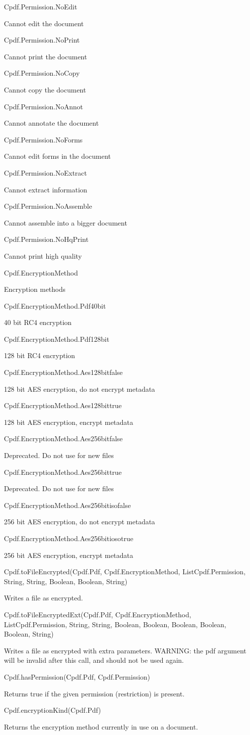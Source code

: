 Cpdf.Permission.NoEdit

Cannot edit the document

Cpdf.Permission.NoPrint

Cannot print the document

Cpdf.Permission.NoCopy

Cannot copy the document

Cpdf.Permission.NoAnnot

Cannot annotate the document

Cpdf.Permission.NoForms

Cannot edit forms in the document

Cpdf.Permission.NoExtract

Cannot extract information

Cpdf.Permission.NoAssemble

Cannot assemble into a bigger document

Cpdf.Permission.NoHqPrint

Cannot print high quality

Cpdf.EncryptionMethod

Encryption methods

Cpdf.EncryptionMethod.Pdf40bit

40 bit RC4 encryption

Cpdf.EncryptionMethod.Pdf128bit

128 bit RC4 encryption

Cpdf.EncryptionMethod.Aes128bitfalse

128 bit AES encryption, do not encrypt metadata

Cpdf.EncryptionMethod.Aes128bittrue

128 bit AES encryption, encrypt metadata

Cpdf.EncryptionMethod.Aes256bitfalse

Deprecated. Do not use for new files

Cpdf.EncryptionMethod.Aes256bittrue

Deprecated. Do not use for new files

Cpdf.EncryptionMethod.Aes256bitisofalse

256 bit AES encryption, do not encrypt metadata

Cpdf.EncryptionMethod.Aes256bitiosotrue

256 bit AES encryption, encrypt metadata

Cpdf.toFileEncrypted(Cpdf.Pdf, Cpdf.EncryptionMethod, List{Cpdf.Permission},
String, String, Boolean, Boolean, String)

Writes a file as encrypted.

Cpdf.toFileEncryptedExt(Cpdf.Pdf, Cpdf.EncryptionMethod, List{Cpdf.Permission},
String, String, Boolean, Boolean, Boolean, Boolean, Boolean, String)

Writes a file as encrypted with extra parameters. WARNING: the pdf argument
will be invalid after this call, and should not be used again.

Cpdf.hasPermission(Cpdf.Pdf, Cpdf.Permission)

Returns true if the given permission
(restriction) is present.

Cpdf.encryptionKind(Cpdf.Pdf)

Returns the encryption method currently in use on
a document.
